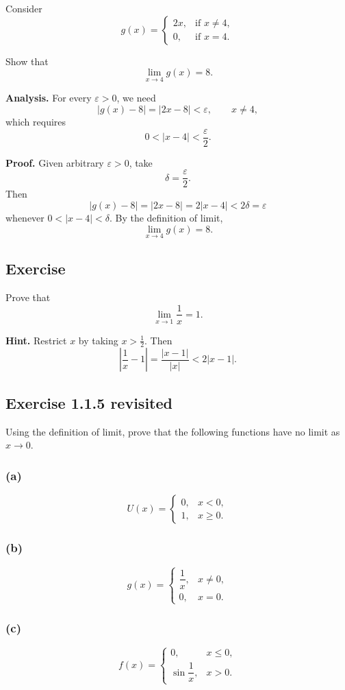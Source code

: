 \documentclass[12pt]{article}
\begin{document}
Consider
\[
g(x)=
\begin{cases}
2x, & \text{if }x\ne4,\\
0, & \text{if }x=4.
\end{cases}
\]

Show that
\[
\lim_{x\to4}g(x)=8.
\]

\textbf{Analysis.} For every $\varepsilon>0$, we need
\[
|g(x)-8|=|2x-8|<\varepsilon,
\qquad x\ne4,
\]
which requires
\[
0<|x-4|<\frac{\varepsilon}{2}.
\]

\textbf{Proof.} Given arbitrary $\varepsilon>0$, take
\[
\delta=\frac{\varepsilon}{2}.
\]
Then
\[
|g(x)-8|=|2x-8|=2|x-4|<2\delta=\varepsilon
\]
whenever $0<|x-4|<\delta$. By the definition of limit,
\[
\lim_{x\to4}g(x)=8.
\]

\subsection*{Exercise}

Prove that
\[
\lim_{x\to1}\frac{1}{x}=1.
\]

\textbf{Hint.} Restrict $x$ by taking $x>\frac12$. Then
\[
\left|\frac{1}{x}-1\right|=\frac{|x-1|}{|x|}<2|x-1|.
\]

\subsection*{Exercise 1.1.5 revisited}

Using the definition of limit, prove that the following functions have no
limit as $x\to0$.

\subsubsection*{(a)}
\[
U(x)=
\begin{cases}
0, & x<0,\\
1, & x\geq0.
\end{cases}
\]

\subsubsection*{(b)}
\[
g(x)=
\begin{cases}
\dfrac{1}{x}, & x\ne0,\\
0, & x=0.
\end{cases}
\]

\subsubsection*{(c)}
\[
f(x)=
\begin{cases}
0, & x\leq0,\\
\sin\dfrac{1}{x}, & x>0.
\end{cases}
\]
\end{document}
